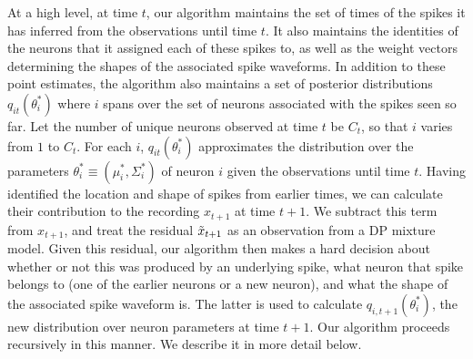 At a high level, at time $t$, our algorithm maintains the set of times of the spikes it has inferred from the observations until time $t$. It also maintains
the identities of the neurons that it assigned each of these spikes to, as well as the weight vectors determining the shapes of the associated spike 
waveforms. In addition to these point estimates, the algorithm also maintains a set of posterior distributions $q_{it}(\theta^*_i)$ where $i$ spans over the
set of neurons associated with the spikes seen so far. Let the number of unique neurons observed at time $t$ be $C_t$, so that $i$ varies from $1$ to $C_t$.
For each $i$, $q_{it}(\theta^*_i)$ approximates the distribution over the parameters 
$\theta_i^* \equiv (\mu_i^*, \Sigma_i^*)$ of neuron $i$ given the observations until time $t$. 
Having identified the location and shape of spikes from earlier times, we can calculate their contribution to the recording $x_{t+1}$ at time $t+1$.
We subtract this term from $x_{t+1}$, and treat the residual $\tilde{x}_{t+1}$ as an observation from a DP mixture model.
Given this residual, our algorithm then makes a hard decision about whether or not this was produced by an underlying spike, what neuron that spike belongs 
to (one of the earlier neurons or a new neuron), and what the shape of the associated spike waveform is. The latter is used to calculate
$q_{i,t+1}(\theta^*_i)$, the new distribution over neuron parameters at time $t+1$. Our algorithm proceeds recursively in this manner. 
We describe it in more detail below.


